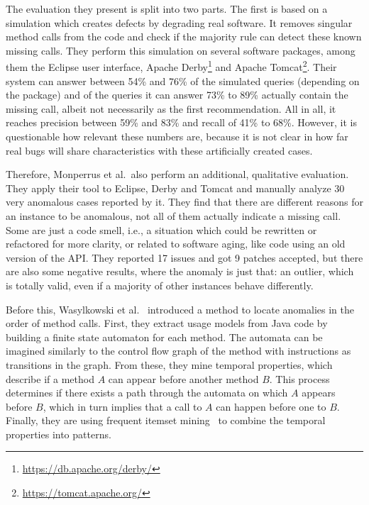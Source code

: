 The evaluation they present is split into two parts.
The first is based on a simulation which creates defects by degrading real software.
It removes singular method calls from the code and check if the majority rule can detect these known missing calls.
They perform this simulation on several software packages, among them the Eclipse user interface, Apache Derby\footnote{\url{https://db.apache.org/derby/}} and Apache Tomcat\footnote{\url{https://tomcat.apache.org/}}.
Their system can answer between 54\% and 76\% of the simulated queries (depending on the package) and of the queries it can answer 73\% to 89\% actually contain the missing call, albeit not necessarily as the first recommendation.
All in all, it reaches precision between 59\% and 83\% and recall of 41\% to 68\%.
However, it is questionable how relevant these numbers are, because it is not clear in how far real bugs will share characteristics with these artificially created cases.

Therefore, Monperrus et al.\ also perform an additional, qualitative evaluation.
They apply their tool to Eclipse, Derby and Tomcat and manually analyze 30 very anomalous cases reported by it.
They find that there are different reasons for an instance to be anomalous, not all of them actually indicate a missing call.
Some are just a code smell, i.e., a situation which could be rewritten or refactored for more clarity, or related to software aging, like code using an old version of the API\@.
They reported 17 issues and got 9 patches accepted, but there are also some negative results, where the anomaly is just that: an outlier, which is totally valid, even if a majority of other instances behave differently.

Before this, Wasylkowski et al.~\cite{wasylkowski2007detecting} introduced a method to locate anomalies in the order of method calls.
First, they extract usage models from Java code by building a finite state automaton for each method.
The automata can be imagined similarly to the control flow graph of the method with instructions as transitions in the graph.
From these, they mine temporal properties, which describe if a method $A$ can appear before another method $B$.
This process determines if there exists a path through the automata on which $A$ appears before $B$, which in turn implies that a call to $A$ can happen before one to $B$.
Finally, they are using frequent itemset mining~\cite{han2006data} to combine the temporal properties into patterns.

